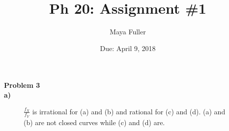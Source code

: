 \documentclass[12pt]{article}
\title{Ph 20: Assignment \#1}
\author{Maya Fuller}
\date{Due: April 9, 2018} %
\begin{document}
	
	
	\maketitle

	\noindent\textbf{\large Problem 3}\\
	\indent\textbf{\large a)}
		\begin{figure}[ht]
			\centering
			\hspace{2mm}
			\caption{$\frac{f_X}{f_Y}$ is irrational for (a) and (b) and rational for (c) and (d). (a) and (b) are not closed curves while (c) and (d) are.}\label{fig:3a}
		\end{figure}
		 
\end{document}
